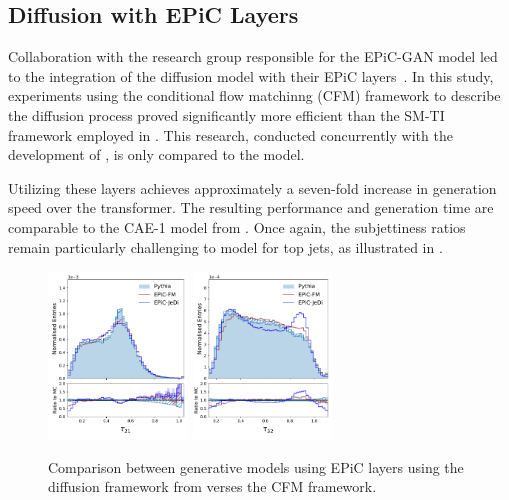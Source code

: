 \subsection{Diffusion with EPiC Layers}

Collaboration with the research group responsible for the EPiC-GAN model led to the integration of the diffusion model with their EPiC layers~\cite{EpicJedi}.
In this study, experiments using the conditional flow matchinng (CFM) framework to describe the diffusion process proved significantly more efficient than the SM-TI framework employed in \pcjedi.
This research, conducted concurrently with the development of \pcdroid, is only compared to the \pcjedi model.

Utilizing these layers achieves approximately a seven-fold increase in generation speed over the transformer.
The resulting performance and generation time are comparable to the CAE-1 model from \pcdroid.
Once again, the subjettiness ratios remain particularly challenging to model for top jets, as illustrated in .

\begin{figure}[tb]
    \centering
    \includegraphics[width=0.33\textwidth]{Figures/jet_generation/t_tau21.pdf}
    \includegraphics[width=0.33\textwidth]{Figures/jet_generation/t_tau32.pdf}
    \caption{
        Comparison between generative models using EPiC layers using the diffusion framework from \pcjedi verses the CFM framework.
    }
    \label{fig:epic-diffusion}
\end{figure}

